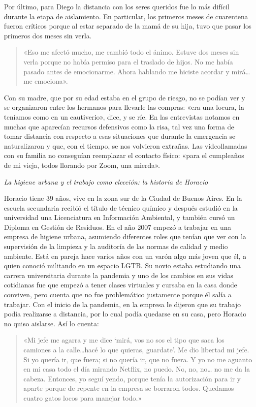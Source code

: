 Por último, para Diego la distancia con los seres queridos fue lo más difícil durante la etapa de aislamiento. En particular, los primeros meses de cuarentena fueron críticos porque al estar separado de la mamá de su hija, tuvo que pasar los primeros dos meses sin verla.

\begin{quote}
«Eso me afectó mucho, me cambió todo el ánimo. Estuve dos meses sin verla porque no había permiso para el traslado de hijos. No me había pasado antes de emocionarme. Ahora hablando me hiciste acordar y mirá\ldots me emociona».
\end{quote}

Con su madre, que por su edad estaba en el grupo de riesgo, no se podían ver y se organizaron entre los hermanos para llevarle las compras: «era una locura, la teníamos como en un cautiverio», dice, y se ríe. En las entrevistas notamos en muchas que aparecían recursos defensivos como la risa, tal vez una forma de tomar distancia con respecto a esas situaciones que durante la emergencia se naturalizaron y que, con el tiempo, se nos volvieron extrañas. Las videollamadas con su familia no conseguían reemplazar el contacto físico: «para el cumpleaños de mi vieja, todos llorando por Zoom, una mierda».

\emph{La higiene urbana y el trabajo como elección: la historia de Horacio}

Horacio tiene 39 años, vive en la zona sur de la Ciudad de Buenos Aires. En la escuela secundaria recibió el título de técnico químico y después estudió en la universidad una Licenciatura en Información Ambiental, y también cursó un Diploma en Gestión de Residuos. En el año 2007 empezó a trabajar en una empresa de higiene urbana, asumiendo diferentes roles que tenían que ver con la supervisión de la limpieza y la auditoría de las normas de calidad y medio ambiente. Está en pareja hace varios años con un varón algo más joven que él, a quien conoció militando en un espacio LGTB. Su novio estaba estudiando una carrera universitaria durante la pandemia y uno de los cambios en sus vidas cotidianas fue que empezó a tener clases virtuales y cursaba en la casa donde conviven, pero cuenta que no fue problemático justamente porque él salía a trabajar. Con el inicio de la pandemia, en la empresa le dijeron que su trabajo podía realizarse a distancia, por lo cual podía quedarse en su casa, pero Horacio no quiso aislarse. Así lo cuenta:

\begin{quote}
«Mi jefe me agarra y me dice `mirá, vos no sos el tipo que saca los camiones a la calle\ldots hacé lo que quieras, guardate'. Me dio libertad mi jefe. Si yo quería ir, que fuera; si no quería ir, que no fuera. Y yo no me aguanto en mi casa todo el día mirando Netflix, no puedo. No, no, no\ldots{} no me da la cabeza. Entonces, yo seguí yendo, porque tenía la autorización para ir y aparte porque de repente en la empresa se borraron todos. Quedamos cuatro gatos locos para manejar todo.»
\end{quote}

